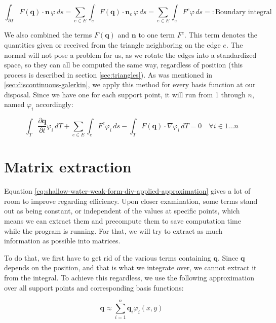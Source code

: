 \documentclass{article}
\newcommand{\pd}[2]{\dfrac{\partial #1}{\partial #2}}
\renewcommand{\phi}{\varphi}
\begin{document}
\begin{equation}
  \label{eq:boundary-integral-sum}
  \int_{\partial T} F(\mathbf{q}) \cdot \mathbf{n} \, \phi \, ds = \sum_{e \in E} \int_{e} F(\mathbf{q}) \cdot \mathbf{n}_e \, \phi \, ds = \sum_{e \in E} \int_{e} F^e \phi \, ds =: \text{Boundary integral}
\end{equation}

We also combined the terms $F(\mathbf{q})$ and $\mathbf{n}$ to one term $F^e$. This term denotes the quantities given or received from the triangle neighboring on the edge $e$. The normal will not pose a problem for us, as we rotate the edges into a standardized space, so they can all be computed the same way, regardless of position (this process is described in section \ref{sec:triangles}). As was mentioned in \ref{sec:discontinuous-galerkin}, we apply this method for every basis function at our disposal. Since we have one for each support point, it will run from 1 through $n$, named $\phi_i$ accordingly:

\begin{equation}
  \label{eq:shallow-water-weak-form-div-applied-approximation}
  \int_T \pd {\mathbf{q}}{t} \phi_i \, dT +
  \sum_{e \in E} \int_{e} F^e \phi_i \, ds  -
  \int_T F(\mathbf{q}) \cdot \nabla \phi_i \, dT = 0
  \quad \forall i \in {1 \dots n}
\end{equation}

\section{Matrix extraction}
\label{sec:matrix-extraction}

Equation \ref{eq:shallow-water-weak-form-div-applied-approximation} gives a lot of room to improve regarding efficiency. Upon closer examination, some terms stand out as being constant, or independent of the values at specific points, which means we can extract them and precompute them to save computation time while the program is running. For that, we will try to extract as much information as possible into matrices.

To do that, we first have to get rid of the various terms containing $\mathbf{q}$. Since $\mathbf{q}$ depends on the position, and that is what we integrate over, we cannot extract it from the integral. To achieve this regardless, we use the following approximation over all support points and corresponding basis functions:

\begin{equation}
  \label{eq:support-point-approximation}
  \mathbf{q} \approx \sum_{i=1}^n \mathbf{q}_i \phi_i\left(x,y\right)
\end{equation}
\end{document}
